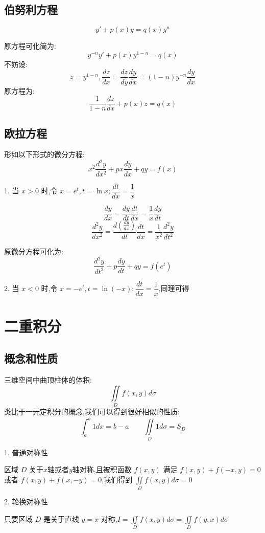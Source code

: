 \section{伯努利方程}
\begin{definition}[伯努利方程]\label{def: 伯努利方程}
	$$y'+p(x)y=q(x)y^{n}$$
\end{definition}
\begin{theorem}
	原方程可化简为:
	$$y^{-n}y'+p(x)y^{1-n}=q(x)$$
	不妨设:  $$z=y^{1-n},\dfrac{dz}{dx}=\dfrac{dz}{dy}\dfrac{dy}{dx}=(1-n)y^{-n}\dfrac{dy}{dx}$$
	原方程为:
	$$\dfrac{1}{1-n}\dfrac{dz}{dx}+p(x)z=q(x)$$
\end{theorem}
\section{欧拉方程}
\begin{definition}[欧拉方程]\label{def: 欧拉方程}
	形如以下形式的微分方程:
	$$x^{2}\dfrac{d^{2}y}{dx^2}+px\dfrac{dy}{dx}+qy=f(x)$$

	1. 当 $x>0$ 时,令 $x=e^t,t=\ln x;\dfrac{dt}{dx}=\dfrac{1}{x}$

	$$\dfrac{dy}{dx}=\dfrac{dy}{dt}\dfrac{dt}{dx}=\dfrac{1}{x}\dfrac{dy}{dt}$$
	$$\dfrac{d^{2}y}{dx^2}=\dfrac{d(\frac{dy}{dx})}{dt}\dfrac{dt}{dx}=\dfrac{1}{x^2}\dfrac{d^{2}y}{dt^2}$$

	原微分方程可化为:
	$$\dfrac{d^{2}y}{dt^2}+p\dfrac{dy}{dt}+qy=f(e^t)$$

	2. 当 $x<0$ 时,令 $x=-e^t,t=\ln(-x);\dfrac{dt}{dx}=\dfrac{1}{x}$,同理可得
\end{definition}
\chapter{二重积分}
\section{概念和性质}
\begin{definition}[二重积分]
	三维空间中曲顶柱体的体积:
	$$\iint\limits_{D}f(x,y)d\sigma$$
	类比于一元定积分的概念,我们可以得到很好相似的性质:
	$$\int_{a}^{b}1dx=b-a\qquad \iint\limits_{D}1d\sigma=S_{D}$$
\end{definition}
\begin{theorem}[对称性]
	1. 普通对称性

	区域 $D$ 关于$x$轴或者$y$轴对称,且被积函数 $f(x,y)$ 满足 $f(x,y)+f(-x,y)=0$ 或者 $f(x,y)+f(x,-y)=0$,我们得到 $\iint\limits_{D}f(x,y)d\sigma=0$

	2. 轮换对称性

	只要区域 $D$ 是关于直线 $y=x$ 对称,$I=\iint\limits_{D}f(x,y)d\sigma=\iint\limits_{D}f(y,x)d\sigma$
\end{theorem}
